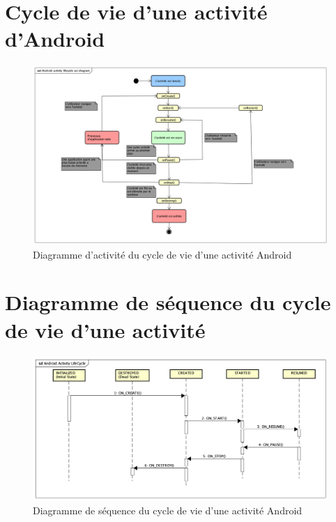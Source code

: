 \setcounter{section}{0}
\renewcommand{\thesection}{\Alph{section}}
\renewcommand{\theHsection}{appendixsection.\Alph{section}}
\section{Cycle de vie d'une activité d'Android }
\begin{figure}[H]
	\centering
	\includegraphics[scale=0.4]{assets/images/Android_lifecycle_act_diagram.png}
	\caption{Diagramme d'activité du cycle de vie d'une activité Android}
	\label{fig.android_act}
\end{figure}
\newpage
\section{Diagramme de séquence du cycle de vie d'une activité}
\begin{figure}[H]
	\centering
	\includegraphics[scale=0.5]{assets/images/Android_LifeCycle_seq.png}
	\caption{Diagramme de séquence du cycle de vie d'une activité Android}
	\label{fig.android_seq}
\end{figure}
